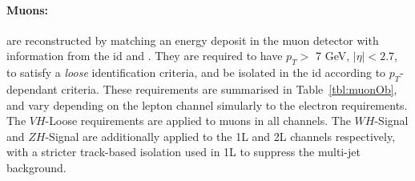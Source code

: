 \begin{table}[!htbp]
  \begin{center}
    \caption{Electron Selection requirements.} %
    \label{tbl:elOb}
  \end{center}
\end{table}

\paragraph{Muons:} are reconstructed by matching an energy deposit in the muon detector with information from the \gls{id} and  \cite{Aad:2746302}. They are required to have $p_T >$ 7 GeV, $|\eta| < 2.7$, to satisfy a \textit{loose} identification criteria, and be isolated in the \gls{id} according to $p_T$-dependant criteria. These requirements are summarised in Table~\ref{tbl:muonOb}, and vary depending on the lepton channel simularly to the electron requirements. The $VH$-Loose requirements are applied to muons in all channels. The $WH$-Signal and $ZH$-Signal are additionally applied to the 1L and 2L channels respectively, with a stricter track-based isolation used in 1L to suppress the multi-jet background.

